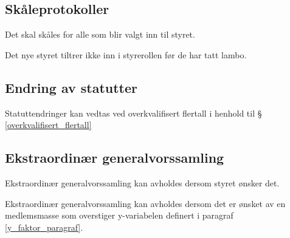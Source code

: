     \subsection{Skåleprotokoller}
        \begin{statute}
            Det skal skåles for alle som blir valgt inn til styret.
        \end{statute}
        \begin{statute}
            Det nye styret tiltrer ikke inn i styrerollen før de har tatt lambo.
        \end{statute}            
    \subsection{Endring av statutter}
        \begin{statute}
            Statuttendringer kan vedtas ved overkvalifisert flertall i henhold til \S\hspace{3pt}  \ref{overkvalifisert_flertall}
        \end{statute}
        
    \subsection{Ekstraordinær generalvorssamling}
        \begin{statute}
            Ekstraordinær generalvorssamling kan avholdes dersom styret ønsker det.
        \end{statute}
        \begin{statute}
            Ekstraordinær generalvorssamling kan avholdes dersom det er ønsket av en medlemsmasse som overstiger y-variabelen definert i paragraf \ref{y_faktor_paragraf}.
        \end{statute}

